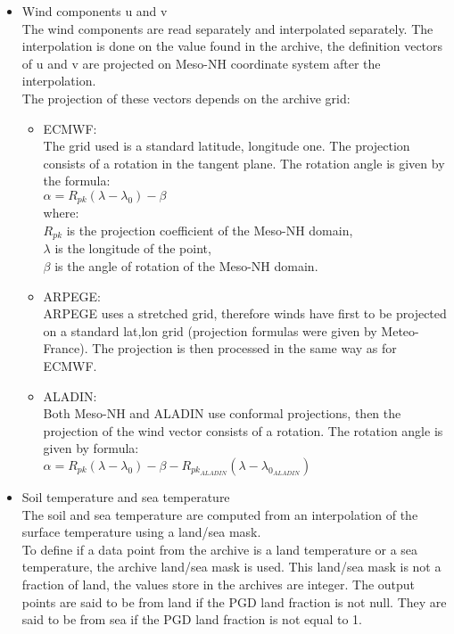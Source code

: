 \begin{itemize}
\item Wind components u and v\\
The wind components are read separately and interpolated separately. The interpolation is
done on the value found in the archive, the definition vectors of u and v are projected
on Meso-NH coordinate system after the interpolation.\\
The projection of these vectors depends on the archive grid:
\begin{itemize}
\item ECMWF:\\
The grid used is a standard latitude, longitude one. The projection consists of a rotation
in the tangent plane. The rotation angle is given by the formula:\\
$\alpha=R_{pk}(\lambda-\lambda_0)-\beta$\\
where:\\
$R_{pk}$ is the projection coefficient of the Meso-NH domain,\\
$\lambda$ is the longitude of the point,\\
$\beta$ is the angle of rotation of the Meso-NH domain.
\item ARPEGE: \\
ARPEGE uses a stretched grid, therefore winds have first to be projected on a
 standard lat,lon grid (projection formulas were given by Meteo-France). The
projection is then processed in the same way as for ECMWF.
\item ALADIN: \\
Both Meso-NH and ALADIN use conformal projections, then the projection of the wind vector
consists of a rotation. The rotation angle is given by formula:\\
$\alpha=R_{pk}(\lambda-\lambda_0)-\beta - R_{pk_{ALADIN}}(\lambda-\lambda_{0_{ALADIN}})$
\end{itemize}
\item Soil temperature and sea temperature\\
The soil and sea temperature are computed from an interpolation of the surface temperature
using a land/sea mask.\\
To define if a data point from the archive is a land temperature or a sea temperature,
the archive land/sea mask is used. This land/sea mask is not a fraction of land, the
values store in the archives are integer. The output points are said to be from land
if the PGD land fraction is not null. They are said to be from sea if the PGD land
fraction is not equal to 1.\\

\end{itemize}

